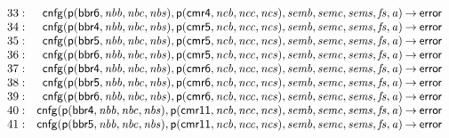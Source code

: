 \documentclass[a4paper]{article}
\newcommand{\symb}[1]{\mathsf{#1}}
\newcommand{\var}[1]{\mathit{#1}}
\begin{document}
\begin{landscape}
\[\begin{array}{rr@{\>}c@{\>}ll}
\mathrm{33} : 
 & \symb{cnfg}(\symb{p}(\symb{bbr6},\var{nbb},\var{nbc},\var{nbs}),\symb{p}(\symb{cmr4},\var{ncb},\var{ncc},\var{ncs}),\var{semb},\var{semc},\var{sems},\var{fs},\var{a})
 & \to 
 & \symb{error}\\

\mathrm{34} : 
 & \symb{cnfg}(\symb{p}(\symb{bbr4},\var{nbb},\var{nbc},\var{nbs}),\symb{p}(\symb{cmr5},\var{ncb},\var{ncc},\var{ncs}),\var{semb},\var{semc},\var{sems},\var{fs},\var{a})
 & \to 
 & \symb{error}\\

\mathrm{35} : 
 & \symb{cnfg}(\symb{p}(\symb{bbr5},\var{nbb},\var{nbc},\var{nbs}),\symb{p}(\symb{cmr5},\var{ncb},\var{ncc},\var{ncs}),\var{semb},\var{semc},\var{sems},\var{fs},\var{a})
 & \to 
 & \symb{error}\\

\mathrm{36} : 
 & \symb{cnfg}(\symb{p}(\symb{bbr6},\var{nbb},\var{nbc},\var{nbs}),\symb{p}(\symb{cmr5},\var{ncb},\var{ncc},\var{ncs}),\var{semb},\var{semc},\var{sems},\var{fs},\var{a})
 & \to 
 & \symb{error}\\

\mathrm{37} : 
 & \symb{cnfg}(\symb{p}(\symb{bbr4},\var{nbb},\var{nbc},\var{nbs}),\symb{p}(\symb{cmr6},\var{ncb},\var{ncc},\var{ncs}),\var{semb},\var{semc},\var{sems},\var{fs},\var{a})
 & \to 
 & \symb{error}\\

\mathrm{38} : 
 & \symb{cnfg}(\symb{p}(\symb{bbr5},\var{nbb},\var{nbc},\var{nbs}),\symb{p}(\symb{cmr6},\var{ncb},\var{ncc},\var{ncs}),\var{semb},\var{semc},\var{sems},\var{fs},\var{a})
 & \to 
 & \symb{error}\\

\mathrm{39} : 
 & \symb{cnfg}(\symb{p}(\symb{bbr6},\var{nbb},\var{nbc},\var{nbs}),\symb{p}(\symb{cmr6},\var{ncb},\var{ncc},\var{ncs}),\var{semb},\var{semc},\var{sems},\var{fs},\var{a})
 & \to 
 & \symb{error}\\

\mathrm{40} : 
 & \symb{cnfg}(\symb{p}(\symb{bbr4},\var{nbb},\var{nbc},\var{nbs}),\symb{p}(\symb{cmr11},\var{ncb},\var{ncc},\var{ncs}),\var{semb},\var{semc},\var{sems},\var{fs},\var{a})
 & \to 
 & \symb{error}\\

\mathrm{41} : 
 & \symb{cnfg}(\symb{p}(\symb{bbr5},\var{nbb},\var{nbc},\var{nbs}),\symb{p}(\symb{cmr11},\var{ncb},\var{ncc},\var{ncs}),\var{semb},\var{semc},\var{sems},\var{fs},\var{a})
 & \to 
 & \symb{error}\\


\end{array}\]
\end{landscape}
\end{document}
